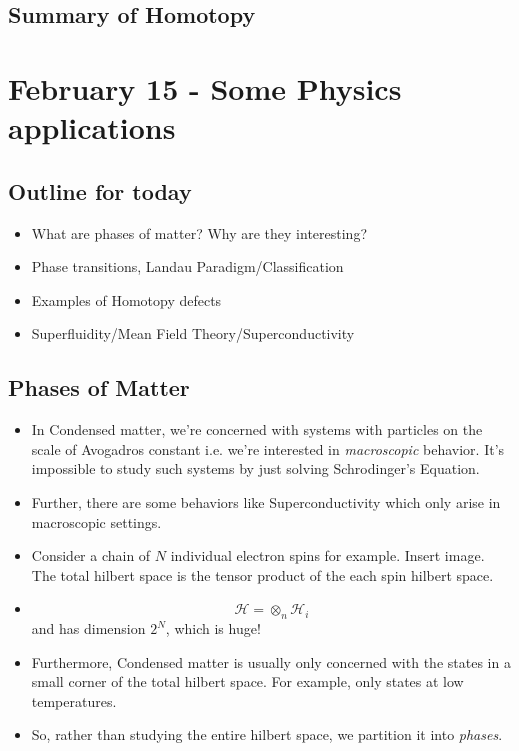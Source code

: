 \documentclass{article}
\begin{document}
\subsection{Summary of Homotopy}

\pagebreak

\section{February 15 - Some Physics applications}

\vskip 1cm
\subsection{Outline for today}
\begin{itemize}
  \item What are phases of matter? Why are they interesting?
  \item Phase transitions, Landau Paradigm/Classification
  \item Examples of Homotopy defects
  \item Superfluidity/Mean Field Theory/Superconductivity
\end{itemize}

\vskip 1cm
\subsection{Phases of Matter}

\begin{itemize}
  \item In Condensed matter, we're concerned with systems with particles on the scale of Avogadros constant i.e. we're interested in \emph{macroscopic} behavior. It's impossible to study such systems by just solving Schrodinger's Equation.

  \item Further, there are some behaviors like Superconductivity which only arise in macroscopic settings.
  
  \item Consider a chain of $N$ individual electron spins for example. Insert image. The total hilbert space is the tensor product of the each spin hilbert space. 
  \item \[ \mathcal{H} = \otimes_n \mathcal{H}_i\]
  and has dimension $2^N$, which is huge!

  \item Furthermore, Condensed matter is usually only concerned with the states in a small corner of the total hilbert space. For example, only states at low temperatures.
  
  \item So, rather than studying the entire hilbert space, we partition it into \emph{phases}.
\end{itemize}
\end{document}
